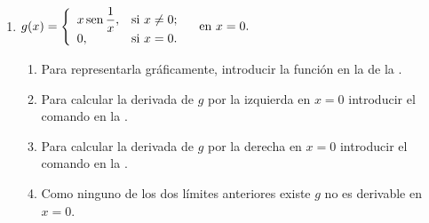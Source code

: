 \begin{enumerate}[leftmargin=*]
\begin{enumerate}
      \item $g(x)=\left\{
            \begin{array}{ll}
            x \operatorname{sen}\dfrac{1}{x}, & \hbox{si $x\neq 0$;} \\
            0,                  & \hbox{si $x=0$.}     \\
            \end{array}
            \right. \quad \textrm{en $x=0$.}$

            \begin{indication}
            \begin{enumerate}
            \item Para representarla gráficamente, introducir la función  en la  de la .
            \item Para calcular la derivada de $g$ por la izquierda en $x=0$ introducir el comando  en la .
            \item Para calcular la derivada de $g$ por la derecha en $x=0$ introducir el comando  en la .
            \item Como ninguno de los dos límites anteriores existe $g$ no es derivable en $x=0$.
            \end{enumerate}
            \end{indication}
      \end{enumerate}



\end{enumerate}
